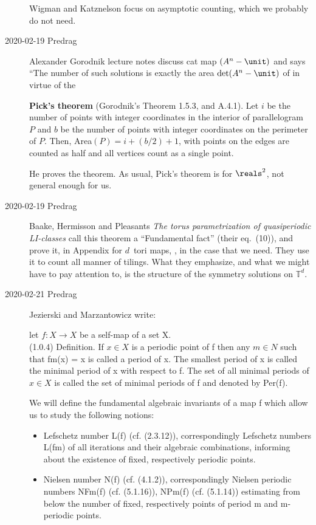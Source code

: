 \begin{description}
Wigman and Katznelson focus on asymptotic counting, which
we probably do not need.

\item[2020-02-19 Predrag]
Alexander Gorodnik
{lecture notes} discuss cat map $(A^n-\unit)$ and says
``The number of such solutions is exactly the area $\det(A^n-\unit)$ of
{\fundPip} in virtue of the

\textbf{Pick's theorem} (Gorodnik's Theorem 1.5.3, and A.4.1).
Let $i$ be the number of points with integer coordinates in the interior
of parallelogram $P$ and $b$ be the number of points with integer
coordinates on the perimeter of $P$. Then, Area$(P) =i+(b/2)+1$, with
points on the edges are counted as half and all vertices count as a
single point.

He proves the theorem. As usual, Pick's theorem is for $\reals^2$, not
general enough for us.

\item[2020-02-19 Predrag]
Baake, Hermisson and Pleasants
{\em The torus parametrization of quasiperiodic {LI}-classes}
call this theorem a ``Fundamental  fact'' (their eq.~(10)), and
prove it, in Appendix for $d$\dmn\ tori maps, \ie,
in the case that we need. They use it to count all manner of tilings.
What they emphasize, and what we might have to
pay attention to, is the structure of the symmetry solutions on
$\mathbb{T}^d$.

\item[2020-02-21 Predrag]
Jezierski and Marzantowicz
 write:

let $f:X \to X$ be a self-map of a set X.\\
(1.0.4) Definition. If $x \in X$ is a periodic point of f then any $m \in
N$ such that fm(x) = x is called a period of x. The smallest period of x
is called the minimal period of x with respect to f. The set of all
minimal periods of $x \in X$ is called the set of minimal periods of f
and denoted by Per(f).

We will define the fundamental algebraic invariants of a map f which
allow us to study the following notions:

\begin{itemize}
  \item Lefschetz number L(f) (cf. (2.3.12)), correspondingly Lefschetz numbers
{L(fm)} of all iterations and their algebraic combinations, informing about
the existence of fixed, respectively periodic points.
  \item Nielsen number N(f) (cf. (4.1.2)), correspondingly Nielsen periodic numbers
NFm(f) (cf. (5.1.16)), NPm(f) (cf. (5.1.14)) estimating from below
the number of fixed, respectively points of period m and m-periodic points.
\end{itemize}


\end{description}
